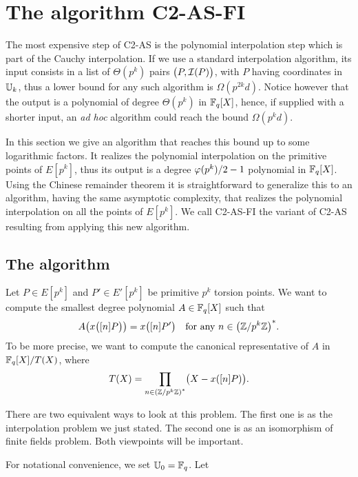 \section{The algorithm C2-AS-FI}
\label{sec:C2-AS-FI}

The most expensive step of C2-AS is the polynomial interpolation step
which is part of the Cauchy interpolation. If we use a standard
interpolation algorithm, its input consists in a list of $\Theta(p^k)$
pairs $\bigl(P, \mathcal{I}(P)\bigr)$, with $P$ having coordinates in $\mathbb{U}_k$,
thus a lower bound for any such algorithm is $\Omega(p^{2k}d)$. Notice
however that the output is a polynomial of degree $\Theta(p^k)$ in
$\mathbb{F}_q[X]$, hence, if supplied with a shorter input, an \emph{ad hoc}
algorithm could reach the bound $\Omega(p^kd)$.

In this section we give an algorithm that reaches this bound up to
some logarithmic factors. It realizes the polynomial interpolation on
the primitive points of $E[p^k]$, thus its output is a degree
$\varphi(p^k)/2-1$ polynomial in $\mathbb{F}_q[X]$. Using the Chinese remainder
theorem it is straightforward to generalize this to an algorithm,
having the same asymptotic complexity, that realizes the polynomial
interpolation on all the points of $E[p^k]$. We call C2-AS-FI the
variant of C2-AS resulting from applying this new algorithm.


\subsection{The algorithm}
Let $P\in E[p^k]$ and $P'\in E'[p^k]$ be primitive $p^k$ torsion
points. We want to compute the smallest degree polynomial
$A\in\mathbb{F}_q[X]$ such that
\begin{equation}
  A\bigl(x\bigl([n]P\bigr)\bigr) = x\bigl([n]P'\bigr)
  \quad\text{for any $n\in\left(\mathbb{Z}/p^k\mathbb{Z}\right)^\ast$.}
\end{equation}
To be more precise, we want to compute the canonical representative of
$A$ in $\mathbb{F}_q[X]/T(X)$, where
\begin{equation}
  T(X) = \prod_{n\in\left(\mathbb{Z}/p^k\mathbb{Z}\right)^\ast} \bigl(X - x([n]P)\bigr)
  \text{.}
\end{equation}
 
There are two equivalent ways to look at this problem. The first one
is as the interpolation problem we just stated. The second one is as
an isomorphism of finite fields problem. Both viewpoints will be
important.

For notational convenience, we set $\mathbb{U}_0=\mathbb{F}_q$.  Let


